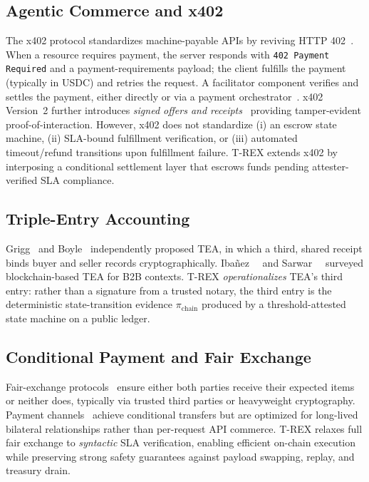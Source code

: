 \documentclass[journal]{IEEEtran}
\begin{document}
\subsection{Agentic Commerce and x402}
The x402 protocol standardizes machine-payable APIs by reviving HTTP 402~\cite{x402spec}. When a resource requires payment, the server responds with \texttt{402 Payment Required} and a payment-requirements payload; the client fulfills the payment (typically in USDC) and retries the request. A facilitator component verifies and settles the payment, either directly or via a payment orchestrator~\cite{x402facilitator}. x402 Version~2 further introduces \emph{signed offers and receipts}~\cite{x402receipts} providing tamper-evident proof-of-interaction. However, x402 does not standardize (i) an escrow state machine, (ii) SLA-bound fulfillment verification, or (iii) automated timeout/refund transitions upon fulfillment failure. T-REX extends x402 by interposing a conditional settlement layer that escrows funds pending attester-verified SLA compliance.

\subsection{Triple-Entry Accounting}
Grigg~\cite{grigg2005} and Boyle~\cite{boyle2001} independently proposed TEA, in which a third, shared receipt binds buyer and seller records cryptographically. Iba\~{n}ez~\etal~\cite{ibanez2023} and Sarwar~\etal~\cite{sarwar2023} surveyed blockchain-based TEA for B2B contexts. T-REX \emph{operationalizes} TEA's third entry: rather than a signature from a trusted notary, the third entry is the deterministic state-transition evidence $\pi_{\text{chain}}$ produced by a threshold-attested state machine on a public ledger.

\subsection{Conditional Payment and Fair Exchange}
Fair-exchange protocols~\cite{asokan2004,pagnia2003} ensure either both parties receive their expected items or neither does, typically via trusted third parties or heavyweight cryptography. Payment channels~\cite{poon2016lightning} achieve conditional transfers but are optimized for long-lived bilateral relationships rather than per-request API commerce. T-REX relaxes full fair exchange to \emph{syntactic} SLA verification, enabling efficient on-chain execution while preserving strong safety guarantees against payload swapping, replay, and treasury drain.
\end{document}

